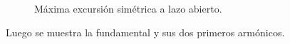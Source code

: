       \begin{figure}[H]
        \centering
          \caption{Máxima excursión simétrica a lazo abierto.}
          \label{fig:Exp7MESLazoAbierto}
      \end{figure}

      Luego se muestra la fundamental y sus dos primeros armónicos.


